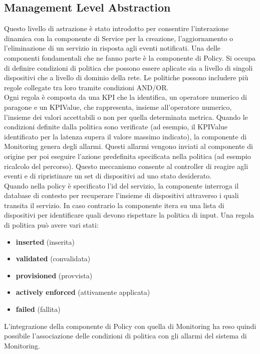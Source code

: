 \subsection{Management Level Abstraction}
Questo livello di astrazione è stato introdotto per consentire l'interazione dinamica con la componente di Service per la creazione, l'aggiornamento o l'eliminazione di un servizio in risposta agli eventi notificati.
Una delle componenti fondamentali che ne fanno parte è la componente di Policy.
Si occupa di definire condizioni di politica che possono essere aplicate sia a livello di singoli dispositivi che a livello di dominio della rete.
Le politiche possono includere più regole collegate tra loro tramite condizioni AND/OR.
\\Ogni regola è composta da una KPI che la identifica, un operatore numerico di paragone e un KPIValue, che rappresenta, insieme all'operatore numerico, l'insieme dei valori accettabili o non per quella determinata metrica.
Quando le condizioni definite dalla politica sono verificate (ad esempio, il KPIValue identificato per la latenza supera il valore massimo indicato), la componente di Monitoring
genera degli allarmi. Questi allarmi vengono inviati al componente di origine per poi eseguire l'azione predefinita specificata nella politica (ad esempio ricalcolo del percorso).
Questo meccanismo consente al controller di reagire agli eventi e di ripristinare un set di dispositivi ad uno stato desiderato.
\\Quando nella policy è specificato l'id del servizio, la componente interroga il database di contesto per recuperare l'insieme di dispositivi attraverso i quali transita il servizio.
In caso contrario la componente itera su una lista di dispositivi per identificare quali devono rispettare la politica di input.
Una regola di politica può avere vari stati:
\begin{itemize}
    \item \textbf{inserted} (inserita)
    \item \textbf{validated} (convalidata)
    \item \textbf{provisioned} (provvista)
    \item \textbf{actively enforced} (attivamente applicata)
    \item \textbf{failed} (fallita)
\end{itemize}
L'integrazione della componente di Policy con quella di Monitoring ha reso quindi possibile l'associazione delle condizioni di politica con gli allarmi del sistema di Monitoring.

